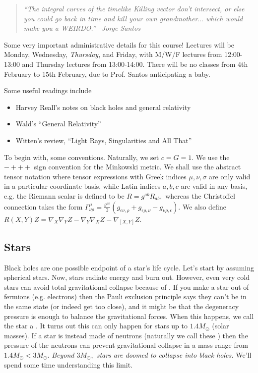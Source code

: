 \begin{quote}
    \textit{``The integral curves of the timelike Killing vector don't intersect, or else you could go back in time and kill your own grandmother$\ldots$ which would make you a WEIRDO.'' --Jorge Santos}
\end{quote}

\begin{note}
Some very important administrative details for this course! Lectures will be Monday, Wednesday, \emph{Thursday}, and Friday, with M/W/F lectures from 12:00-13:00 and Thursday lectures from 13:00-14:00. There will be no classes from 4th February to 15th February, due to Prof. Santos anticipating a baby.

Some useful readings include
\begin{itemize}
    \item Harvey Reall's notes on black holes and general relativity
    \item Wald's ``General Relativity''
    \item Witten's review, ``Light Rays, Singularities and All That''
\end{itemize}
\end{note}

To begin with, some conventions. Naturally, we set $c=G=1$. We use the $-+++$ sign convention for the Minkowski metric. We shall use the abstract tensor notation where tensor expressions with Greek indices $\mu,\nu,\sigma$ are only valid in a particular coordinate basis, while Latin indices $a,b,c$ are valid in any basis, e.g. the Riemann scalar is defined to be $R=g^{ab}R_{ab},$ whereas the Christoffel connection takes the form $\Gamma^\mu_{\nu\rho}=\frac{g^{\mu\epsilon}}{2}(g_{\epsilon \nu,\rho}+g_{\epsilon \rho, \nu}-g_{\nu\rho,\epsilon}).$ We also define $R(X,Y)Z=\nabla_X \nabla_Y Z -\nabla_Y \nabla_X Z - \nabla_{[X,Y]}Z$.

\subsection*{Stars} Black holes are one possible endpoint of a star's life cycle. Let's start by assuming spherical stars. Now, stars radiate energy and burn out. However, even very cold stars can avoid total gravitational collapse because of . If you make a star out of fermions (e.g. electrons) then the Pauli exclusion principle says they can't be in the same state (or indeed get too close), and it might be that the degeneracy pressure is enough to balance the gravitational forces. When this happens, we call the star a . It turns out this can only happen for stars up to $1.4 M_\odot$ (solar masses). If a star is instead made of neutrons (naturally we call these ) then the pressure of the neutrons can prevent gravitational collapse in a mass range from $1.4 M_\odot < 3 M_\odot$.
\emph{Beyond $3 M_{\odot},$ stars are doomed to collapse into black holes.} We'll spend some time understanding this limit.

